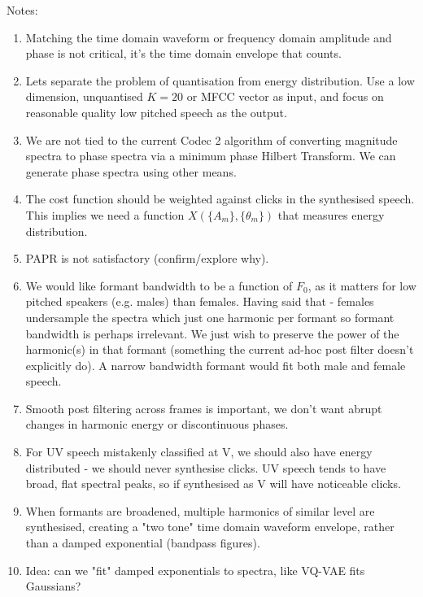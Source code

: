 \documentclass{article}
\begin{document}
Notes:
\begin{enumerate}
\item Matching the time domain waveform or frequency domain amplitude and phase is not critical, it's the time domain envelope that counts.
\item Lets separate the problem of quantisation from energy distribution.  Use a low dimension, unquantised $K=20$ or MFCC vector as input, and focus on reasonable quality low pitched speech as the output.
\item We are not tied to the current Codec 2 algorithm of converting magnitude spectra to phase spectra via a minimum phase Hilbert Transform.  We can generate phase spectra using other means.
\item The cost function should be weighted against clicks in the synthesised speech.  This implies we need a function $X(\{A_m\},\{\theta_m\})$ that measures energy distribution.
\item PAPR is not satisfactory (confirm/explore why).
\item We would like formant bandwidth to be a function of $F_0$, as it matters for low pitched speakers (e.g. males) than females.  Having said that - females undersample the spectra which just one harmonic per formant so formant bandwidth is perhaps irrelevant.  We just wish to preserve the power of the harmonic(s) in that formant (something the current ad-hoc post filter doesn't explicitly do).  A narrow bandwidth formant would fit both male and female speech.
\item Smooth post filtering across frames is important, we don't want abrupt changes in harmonic energy or discontinuous phases.
\item For UV speech mistakenly classified at V, we should also have energy distributed - we should never synthesise clicks.  UV speech tends to have broad, flat spectral peaks, so if synthesised as V will have noticeable clicks.
\item When formants are broadened, multiple harmonics of similar level are synthesised, creating a "two tone" time domain waveform envelope, rather than a damped exponential (bandpass figures).
\item Idea: can we "fit" damped exponentials to spectra, like VQ-VAE fits Gaussians?
\end{enumerate}
\end{document}
